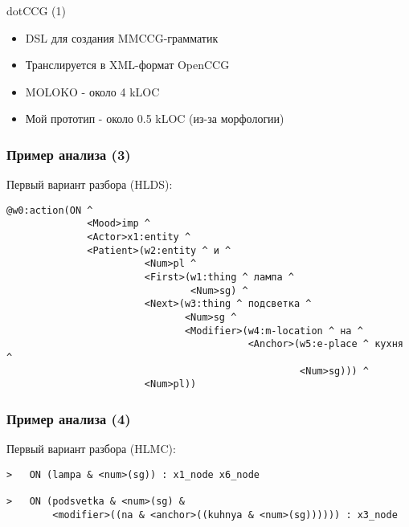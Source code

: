 \documentclass{beamer}
\begin{document}
\begin{frame}{dotCCG (1)}
\begin{itemize}
	\item DSL для создания MMCCG-грамматик
	\item Транслируется в XML-формат OpenCCG
	\item MOLOKO - около 4 kLOC 
	\item Мой прототип - около 0.5 kLOC (из-за морфологии)
\end{itemize}
\end{frame}



\begin{frame}[fragile]
\frametitle{Пример анализа (3)}
Первый вариант разбора (HLDS):\\
\bigskip
\begin{center}
{\scriptsize \begin{verbatim}
@w0:action(ON ^ 
              <Mood>imp ^ 
              <Actor>x1:entity ^ 
              <Patient>(w2:entity ^ и ^ 
                        <Num>pl ^ 
                        <First>(w1:thing ^ лампа ^ 
                                <Num>sg) ^ 
                        <Next>(w3:thing ^ подсветка ^ 
                               <Num>sg ^ 
                               <Modifier>(w4:m-location ^ на ^ 
                                          <Anchor>(w5:e-place ^ кухня ^ 
                                                   <Num>sg))) ^ 
                        <Num>pl))
\end{verbatim}
}                        
\end{center}
\end{frame}

\begin{frame}[fragile]
\frametitle{Пример анализа (4)}
Первый вариант разбора (HLMC):\\
\bigskip
\begin{center}
{\scriptsize \begin{verbatim}
>   ON (lampa & <num>(sg)) : x1_node x6_node 

>   ON (podsvetka & <num>(sg) & 
        <modifier>((na & <anchor>((kuhnya & <num>(sg)))))) : x3_node 
\end{verbatim}
}                        
\end{center}
\end{frame}
\end{document}
